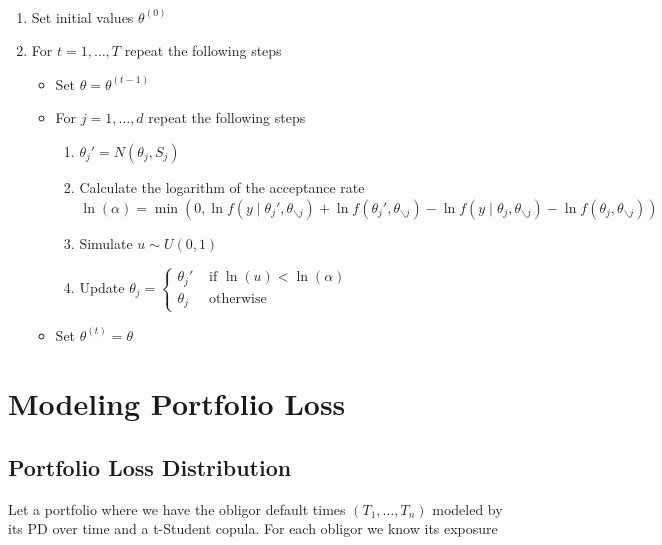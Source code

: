 \documentclass[11pt,fleqn]{book} %
\begin{document}
\begin{algorithm} \ 
\label{alg:bimh}
	\begin{enumerate}
		\item Set initial values $\theta^{(0)}$
		\item For $t=1,\dots,T$ repeat the following steps
		\begin{itemize}
			\item Set $\theta=\theta^{(t-1)}$
			\item For $j=1,\dots,d$ repeat the following steps
			\begin{enumerate}[label=\alph*.]
				\item $\theta_j' = N(\theta_j,S_j)$
				\item Calculate the logarithm of the acceptance rate \\
				$\ln(\alpha) = \min \left( 0,
				\ln f(y \mid \theta_j',\theta_{\backslash j}) + 
				\ln f(\theta_j',\theta_{\backslash j}) - 
				\ln f(y \mid \theta_j,\theta_{\backslash j}) - 
				\ln f(\theta_j,\theta_{\backslash j})
				\right)$
				\item Simulate $u \sim U(0,1)$
				\item Update $\theta_j=\left\{
				\begin{array}{ll}
					\theta_j' & \text{ if } \ln(u) < \ln(\alpha) \\
					\theta_j  & \text{ otherwise }               
				\end{array}\right.$ 
			\end{enumerate}
			\item Set $\theta^{(t)}=\theta$
		\end{itemize}
	\end{enumerate}
\end{algorithm}


\chapter{Modeling Portfolio Loss}

\section{Portfolio Loss Distribution}

Let a portfolio where we have the obligor default times
$(T_1,\dots,T_n)$ modeled by its PD over time and a
t-Student copula. For each obligor we know its exposure
\end{document}
